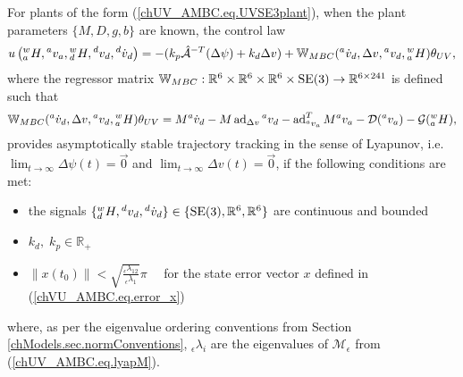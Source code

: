\begin{UV_MBC}
\label{chUV_AMBC.theo.UV_MBC}

For plants of the form (\ref{chUV_AMBC.eq.UVSE3plant}), %
when the plant parameters %
 $\{M,D,g,b\}$
 are known, the control law
%
\begin{equation}
u\left( {^w_a}H, {^a}v_a, {^w_d}H, {^d}v_d, {^d}\dot{v}_d\right)
=-(k_p\hat{\mathcal{A}}^{-T}(\Delta \psi)+k_d\Delta v)+ 
\mathbb{W}_{MBC}({^a}\dot{v}_d,\Delta v, {^a}v_d , {^w_a}H)\theta_{UV},
\label{chUV_AMBC.eq.MBC_controlLaw}
\end{equation}
%
\noindent where the regressor matrix
$\MBCreg:\mathbb{R}^6\times\mathbb{R}^6\times\mathbb{R}^6\times\SE3\to
\mathbb{R}^{6 \times 241}$ is defined such that
%
\begin{equation}
\mathbb{W}_{MBC}({^a}\dot{v}_d,\Delta v, {^a}v_d , {^w_a}H)\theta_{UV} =
    M{^a}\dot{v}_d - M\operatorname{ad}_{\Delta v}{^a}v_d -\operatorname{ad}_{{^a}v_a}^T M{^a}v_a
    -\mathcal{D}({^a}v_a)-\mathcal{G}({^w_a}H),
\label{chUV_AMBC.eq.MBC_regressor}
\end{equation}
%
provides asymptotically stable trajectory tracking in the
sense of Lyapunov, i.e.  $\lim_{t\to \infty}\Delta \psi(t)=\vec{0}$
and $\lim_{t\to \infty}\Delta v(t)=\vec{0}$, if the following
conditions are met:

\begin{itemize}
\item the signals $\{{^w_d}H,{^d}v_d,{^d}\dot{v}_d
  \}\in\{\SE3,\realSpace{6},\realSpace{6}\}$ are continuous and bounded 
\item $k_d,\; k_p\in\mathbb{R}_+$
\item $\|x(t_0)\|<\sqrt{
                  \frac{ {_\epsilon}\lambda_{12} }
                       { {_\epsilon}\lambda_1   }
                       } \pi\quad$
%
for the state error vector $x$ defined in (\ref{chVU_AMBC.eq.error_x}) 
\end{itemize}

\noindent where, as per the eigenvalue ordering conventions from
Section \ref{chModels.sec.normConventions}, ${_\epsilon}\lambda_{i}$
are the eigenvalues of
%
$\mathcal{M}_\epsilon$ from (\ref{chUV_AMBC.eq.lyapM}).
\end{UV_MBC}





